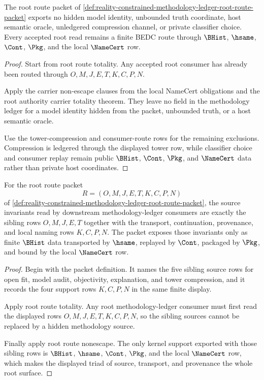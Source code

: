 \begin{theorem}
\label{thm:reality-constrained-methodology-ledger-root-route-nonescape}
The root route packet of \autoref{def:reality-constrained-methodology-ledger-root-route-packet} exports no hidden model identity, unbounded truth coordinate, host semantic oracle, unledgered compression channel, or private classifier choice. Every accepted root read remains a finite BEDC route through $\BHist$, $\hsame$, $\Cont$, $\Pkg$, and the local $\NameCert$ row.
\end{theorem}
\begin{proof}
Start from root route totality. Any accepted root consumer has already been routed through $O,M,J,E,T,K,C,P,N$.

Apply the carrier non-escape clauses from the local NameCert obligations and the root authority carrier totality theorem. They leave no field in the methodology ledger for a model identity hidden from the packet, unbounded truth, or a host semantic oracle.

Use the tower-compression and consumer-route rows for the remaining exclusions. Compression is ledgered through the displayed tower row, while classifier choice and consumer replay remain public $\BHist$, $\Cont$, $\Pkg$, and $\NameCert$ data rather than private host coordinates.
\end{proof}

\begin{theorem}
\label{thm:reality-constrained-methodology-ledger-root-source-invariant-triad}
For the root route packet
$$
R=(O,M,J,E,T,K,C,P,N)
$$
of \autoref{def:reality-constrained-methodology-ledger-root-route-packet}, the source invariants read by downstream methodology-ledger consumers are exactly the sibling rows $O,M,J,E,T$ together with the transport, continuation, provenance, and local naming rows $K,C,P,N$. The packet exposes those invariants only as finite $\BHist$ data transported by $\hsame$, replayed by $\Cont$, packaged by $\Pkg$, and bound by the local $\NameCert$ row.
\end{theorem}
\begin{proof}
Begin with the packet definition. It names the five sibling source rows for open fit, model audit, objectivity, explanation, and tower compression, and it records the four support rows $K,C,P,N$ in the same finite display.

Apply root route totality. Any root methodology-ledger consumer must first read the displayed rows $O,M,J,E,T,K,C,P,N$, so the sibling sources cannot be replaced by a hidden methodology source.

Finally apply root route nonescape. The only kernel support exported with those sibling rows is $\BHist$, $\hsame$, $\Cont$, $\Pkg$, and the local $\NameCert$ row, which makes the displayed triad of source, transport, and provenance the whole root surface.
\end{proof}

